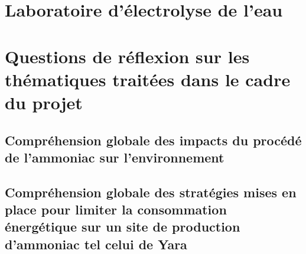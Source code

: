 \section{Laboratoire d'électrolyse de l'eau}

\section{Questions de réflexion sur les thématiques traitées
dans le cadre du projet}
\subsection{Compréhension globale des impacts du procédé de l'ammoniac sur l'environnement}
\subsection{Compréhension globale des stratégies mises en place pour limiter la consommation 
énergétique sur un site de production d'ammoniac tel celui de Yara}

